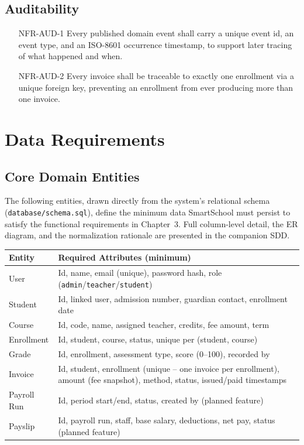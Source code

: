 \documentclass[11pt,a4paper]{report}
\newcommand{\sysname}{SmartSchool}
\begin{document}
\section{Auditability}
\begin{itemize}[itemsep=3pt]
    \item[NFR-AUD-1] Every published domain event shall carry a unique event id, an event type, and an ISO-8601 occurrence timestamp, to support later tracing of what happened and when.
    \item[NFR-AUD-2] Every invoice shall be traceable to exactly one enrollment via a unique foreign key, preventing an enrollment from ever producing more than one invoice.
\end{itemize}

\chapter{Data Requirements}

\section{Core Domain Entities}
The following entities, drawn directly from the system's relational schema
(\texttt{database/schema.sql}), define the minimum data \sysname{} must
persist to satisfy the functional requirements in Chapter~3. Full
column-level detail, the ER diagram, and the normalization rationale are
presented in the companion SDD.

\begin{longtable}{L{3.0cm} L{11.0cm}}
\toprule
\textbf{Entity} & \textbf{Required Attributes (minimum)} \\
\midrule
\endhead
User & Id, name, email (unique), password hash, role (\texttt{admin}/\texttt{teacher}/\texttt{student}) \\
Student & Id, linked user, admission number, guardian contact, enrollment date \\
Course & Id, code, name, assigned teacher, credits, fee amount, term \\
Enrollment & Id, student, course, status, unique per (student, course) \\
Grade & Id, enrollment, assessment type, score (0--100), recorded by \\
Invoice & Id, student, enrollment (unique -- one invoice per enrollment), amount (fee snapshot), method, status, issued/paid timestamps \\
Payroll Run & Id, period start/end, status, created by (planned feature) \\
Payslip & Id, payroll run, staff, base salary, deductions, net pay, status (planned feature) \\
\bottomrule
\end{longtable}
\end{document}
